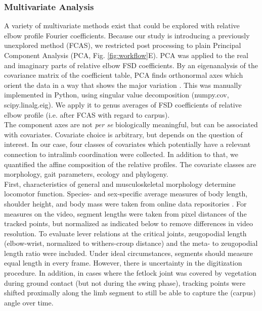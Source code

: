 \documentclass[10pt, a4paper]{article}
\begin{document}
\subsubsection{Multivariate Analysis}
A variety of multivariate methods exist that could be explored with relative elbow profile Fourier coefficients. 
Because our study is introducing a previously unexplored method (FCAS), we restricted post processing to plain Principal Component Analysis (PCA, Fig. \ref{fig:workflow}E). 
PCA was applied to the real and imaginary parts of relative elbow FSD coefficients. 
By an eigenanalysis of the covariance matrix of the coefficient table, PCA finds orthonormal axes which orient the data in a way that shows the major variation \citep[\textit{cf.}][]{MacLeod2007}. 
This was manually implemented in Python, using singular value decomposition (\textsf{numpy.cov}, \textsf{scipy.linalg.eig}). 
We apply it to genus averages \citep{Mitteroecker2011} of FSD coefficients of relative elbow profile (i.e. after FCAS with regard to carpus). 
\\The component axes are not \textit{per se} biologically meaningful, but can be associated with covariates. 
Covariate choice is arbitrary, but depends on the question of interest. 
In our case, four classes of covariates which potentially have a relevant connection to intralimb coordination were collected. 
In addition to that, we quantified the affine composition of the relative profiles. 
The covariate classes are morphology, gait parameters, ecology and phylogeny. 
\\First, characteristics of general and musculoskeletal morphology determine locomotor function. 
Species- and sex-specific average measures of body length, shoulder height, and body mass were taken from online data repositories \citep{UltimateUngulate,AnimalDiversityWeb}. 
For measures on the video, segment lengths were taken from pixel distances of the tracked points, but normalized as indicated below to remove differences in video resolution. 
To evaluate lever relations at the critical joints, zeugopodial length (elbow-wrist, normalized to withers-croup distance) and the meta- to zeugopodial length ratio were included. 
Under ideal circumstances, segments should measure equal length in every frame. 
However, there is uncertainty in the digitization procedure. 
In addition, in cases where the fetlock joint was covered by vegetation during ground contact (but not during the swing phase), tracking points were shifted proximally along the limb segment to still be able to capture the (carpus) angle over time. 
\end{document}
